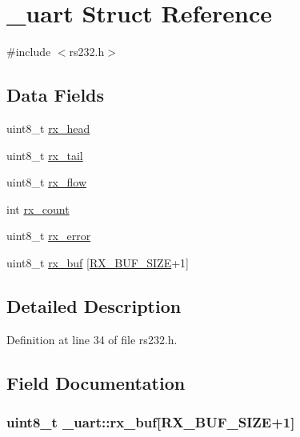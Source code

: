 \hypertarget{struct__uart}{}\section{\+\_\+uart Struct Reference}
\label{struct__uart}


{\ttfamily \#include $<$rs232.\+h$>$}

\subsection*{Data Fields}
\begin{DoxyCompactItemize}
\item 
uint8\+\_\+t \hyperlink{struct__uart_add14728bfbde14b7c260c8ff09bcd91b}{rx\+\_\+head}
\item 
uint8\+\_\+t \hyperlink{struct__uart_a4bd6a544526fe5ac94a5f9af09e3bbeb}{rx\+\_\+tail}
\item 
uint8\+\_\+t \hyperlink{struct__uart_a193691b69079880daf5b5b9894fb6aa5}{rx\+\_\+flow}
\item 
int \hyperlink{struct__uart_a50b344402c339343e3f32c82358e190c}{rx\+\_\+count}
\item 
uint8\+\_\+t \hyperlink{struct__uart_a6c0b44754c36dd831e1da4f02b124167}{rx\+\_\+error}
\item 
uint8\+\_\+t \hyperlink{struct__uart_a68a8939d4be8a563157c98b5baa50ae0}{rx\+\_\+buf} \mbox{[}\hyperlink{rs232_8h_a690f985c933da2ce6fe62b6c61dfa662}{R\+X\+\_\+\+B\+U\+F\+\_\+\+S\+I\+ZE}+1\mbox{]}
\end{DoxyCompactItemize}


\subsection{Detailed Description}


Definition at line 34 of file rs232.\+h.



\subsection{Field Documentation}
\subsubsection[{\texorpdfstring{rx\+\_\+buf}{rx_buf}}]{\setlength{\rightskip}{0pt plus 5cm}uint8\+\_\+t \+\_\+uart\+::rx\+\_\+buf\mbox{[}{\bf R\+X\+\_\+\+B\+U\+F\+\_\+\+S\+I\+ZE}+1\mbox{]}}\hypertarget{struct__uart_a68a8939d4be8a563157c98b5baa50ae0}{}\label{struct__uart_a68a8939d4be8a563157c98b5baa50ae0}


